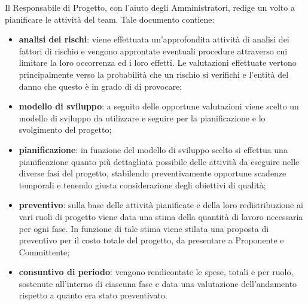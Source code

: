     Il Responsabile di Progetto, con l'aiuto degli Amministratori, redige un \PdP{} volto a pianificare le attività del team. Tale documento contiene:
    \begin{itemize}
       		\item{\textbf{analisi dei rischi}: viene effettuata un'approfondita attività di analisi dei fattori di rischio e vengono approntate eventuali procedure attraverso cui limitare la loro occorrenza ed i loro effetti.
       		Le valutazioni effettuate vertono principalmente verso la probabilità che un rischio si verifichi e l'entità del danno che questo è in grado di di provocare;}
       		\item{\textbf{modello di sviluppo}: a seguito delle opportune valutazioni viene scelto un modello di sviluppo da utilizzare e seguire per la pianificazione e lo svolgimento del progetto;}
       		\item{\textbf{pianificazione}: in funzione del modello di sviluppo scelto si effettua una pianificazione quanto più dettagliata possibile delle attività da eseguire nelle diverse fasi del progetto, stabilendo preventivamente opportune scadenze temporali e tenendo giusta considerazione degli obiettivi di qualità;}
       		\item{\textbf{preventivo}: sulla base delle attività pianificate e della loro redistribuzione ai vari ruoli di progetto viene data una stima della quantità di lavoro necessaria per ogni fase. In funzione di tale stima viene stilata una proposta di preventivo per il costo totale del progetto, da presentare a Proponente e Committente;}
       		\item{\textbf{consuntivo di periodo}: vengono rendicontate le spese, totali e per ruolo, sostenute all'interno di ciascuna fase e data una valutazione dell'andamento rispetto a quanto era stato preventivato.}
    \end{itemize}

